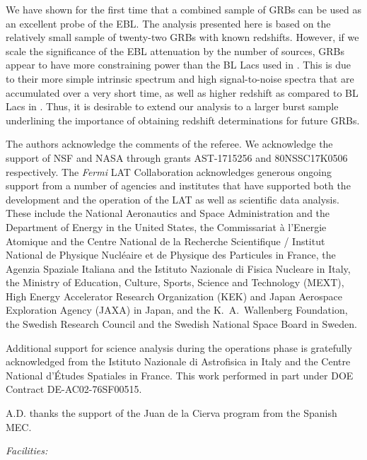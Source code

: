 \documentclass[12pt,preprint]{aastex}
\begin{document}
 {We have shown for the first time that a combined sample of GRBs 
can be used as an excellent probe of the EBL.}
The analysis presented here is based on the relatively small sample of {twenty-two} GRBs with 
known redshifts. However, if we scale the significance of the EBL attenuation by the number
of sources, GRBs appear to have more constraining power than the BL
Lacs used in \cite{ebl12}. This is due to their more simple intrinsic spectrum and high
signal-to-noise spectra that are accumulated over a very short time,
as well as higher
redshift as compared to {BL Lacs in} \cite{ebl12}. 
 {Thus, it is desirable to extend our analysis to a larger burst sample 
underlining the importance of obtaining redshift determinations for 
 {future} GRBs.}



\acknowledgments
The authors acknowledge the comments of the referee. We acknowledge the support of NSF and NASA through grants AST-1715256 and 80NSSC17K0506 respectively.
 The \textit{Fermi} LAT Collaboration acknowledges generous ongoing support
from a number of agencies and institutes that have supported both the
development and the operation of the LAT as well as scientific data analysis.
These include the National Aeronautics and Space Administration and the
Department of Energy in the United States, the Commissariat \`a l'Energie Atomique
and the Centre National de la Recherche Scientifique / Institut National de Physique
Nucl\'eaire et de Physique des Particules in France, the Agenzia Spaziale Italiana
and the Istituto Nazionale di Fisica Nucleare in Italy, the Ministry of Education,
Culture, Sports, Science and Technology (MEXT), High Energy Accelerator Research
Organization (KEK) and Japan Aerospace Exploration Agency (JAXA) in Japan, and
the K.~A.~Wallenberg Foundation, the Swedish Research Council and the
Swedish National Space Board in Sweden.
 
Additional support for science analysis during the operations phase is gratefully
acknowledged from the Istituto Nazionale di Astrofisica in Italy and the Centre
National d'\'Etudes Spatiales in France. This work performed in part under DOE
Contract DE-AC02-76SF00515.

A.D. thanks the support of the Juan de la Cierva program from the Spanish MEC.




{\it Facilities:} 






\setcounter{enumi}{1}
\end{document}
